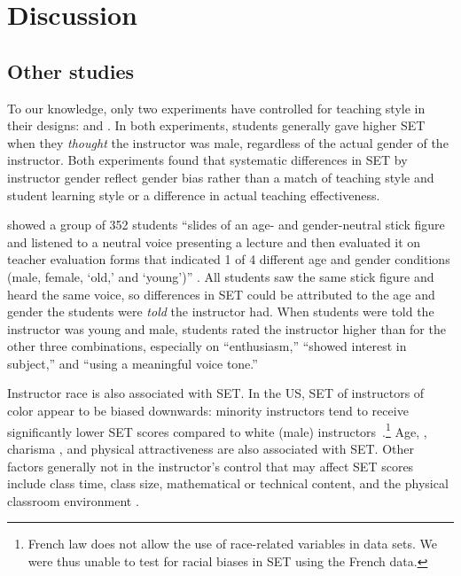 \documentclass[12pt]{article}
\begin{document}
\section{Discussion}

\subsection{Other studies}
To our knowledge, only two experiments have controlled for teaching style in
their designs: \citet{Arbuckle2003} and \citet{MacNell2014}. 
In both experiments, students generally gave higher SET when they 
\emph{thought} the instructor
was male, regardless of the actual gender of the instructor.
Both experiments found that systematic differences in SET by instructor gender reflect gender bias 
rather than a match of teaching style and student learning style or a difference
in actual teaching effectiveness. 

\citet{Arbuckle2003} showed a group of 352 students 
``slides of an age- and gender-neutral stick figure and listened to a neutral voice 
presenting a lecture and then evaluated it on teacher evaluation forms that indicated 
1 of 4 different age and gender conditions 
(male, female, `old,' and `young')'' \citep[p.507]{Arbuckle2003}. 
All  students saw the same stick figure and heard the same voice, so differences in SET 
could be attributed to the age and gender the students were \emph{told} the instructor had.
When students were told the instructor was
young and male, students rated the instructor higher than for
the other three combinations, especially on ``enthusiasm,'' ``showed interest in subject,'' 
and ``using a meaningful voice tone.'' 

Instructor race is also associated with SET.
In the US, SET of instructors of color appear to be biased downwards:
minority instructors tend to receive significantly lower SET scores compared to white (male) 
instructors~\citep{Merritt2008}.\footnote{%
  French law does not allow the use of race-related variables in data sets. 
  We were thus unable to test for racial biases in SET using the French data.
} 
Age, \citep{Arbuckle2003}, 
charisma \citep{Shevlin2000}, and 
physical attractiveness \citep{Riniolo2006,Hamermesh2005} 
are also associated with SET.
Other factors generally not in the instructor's control that may affect SET scores include
class time, class size, mathematical or technical content, and the 
physical classroom environment \citep{Hill2010}.
\end{document}
